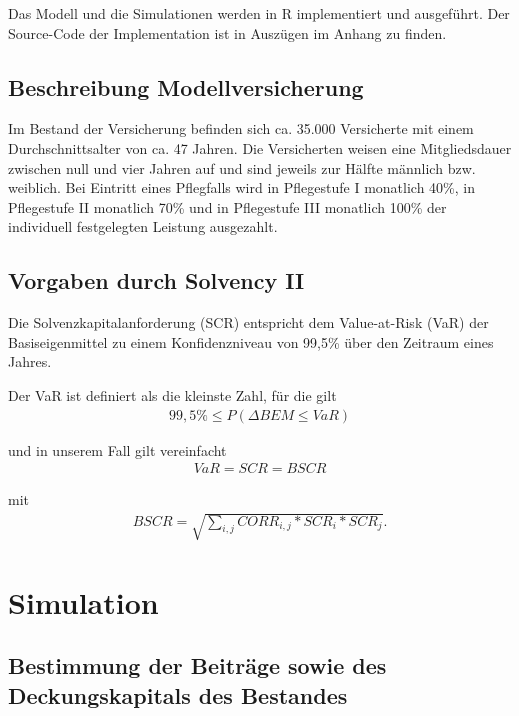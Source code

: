 \documentclass[parskip,12pt,paper=a4]{scrartcl}
\begin{document}
Das Modell und die Simulationen werden in \textsc{R} implementiert und ausgeführt. Der Source-Code der Implementation ist in Auszügen im Anhang zu finden. 

\subsection{Beschreibung Modellversicherung}

Im Bestand der Versicherung befinden sich ca. 35.000 Versicherte mit einem Durchschnittsalter von ca. 47 Jahren. Die Versicherten weisen eine Mitgliedsdauer zwischen null und vier Jahren auf und sind jeweils zur Hälfte männlich bzw. weiblich.
Bei Eintritt eines Pflegfalls wird in Pflegestufe I monatlich 40\%, in Pflegestufe II monatlich 70\% und in Pflegestufe III 
monatlich 100\% der individuell festgelegten Leistung ausgezahlt. \\


\subsection{Vorgaben durch Solvency II}
Die Solvenzkapitalanforderung (SCR) entspricht dem \glqq Value-at-Risk (VaR) der Basiseigenmittel zu einem Konfidenzniveau von 99,5\% über den Zeitraum eines Jahres\grqq .

Der VaR ist definiert als die kleinste Zahl, für die gilt
\begin{align*}
99,5\% \le P(\Delta BEM \le VaR)
\end{align*}

und in unserem Fall gilt vereinfacht 
\begin{align*}
VaR = SCR = BSCR
\end{align*}

mit
\begin{align*}
BSCR = \sqrt{ \sum_{i,j} CORR_{i,j} * SCR_i * SCR_j }.
\end{align*}

\section{Simulation}

\subsection{Bestimmung der Beiträge sowie des Deckungskapitals des Bestandes}
\end{document}
